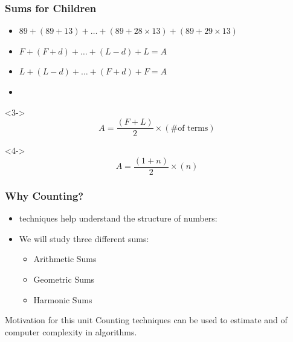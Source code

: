 \documentclass{beamer}
\begin{document}
\begin{frame}
  \frametitle{Sums for Children}

  {\larger
    
    \begin{itemize}
    \item $89 + (89+13) + \ldots + (89+28\times13) +(89+29\times13)$
    \item $F + (F+d) + \ldots + (L-d) + L = A$
    \item<2-> $L + (L-d) + \ldots + (F+d) + F = A$
    \item<3-> 
    \end{itemize}

    \bigskip

    \begin{onlyenv}<3->
      \begin{equation}
        A = \frac{(F+L)}{2} \times (\text{\# of terms})
      \end{equation}
    \end{onlyenv}

    \begin{onlyenv}<4->
      \begin{equation}
        A = \frac{(1+n)}{2} \times (n)
      \end{equation}
    \end{onlyenv}
    
  }
\end{frame}
  

\begin{frame}
  \frametitle{Why Counting?}

  {\larger

    \begin{itemize}
    \item {} techniques help understand the structure of numbers:
    \item We will study three different sums:
      \begin{itemize}
      \item Arithmetic Sums
      \item Geometric Sums
      \item Harmonic Sums
      \end{itemize}  
    \end{itemize}

    \bigskip

    \begin{block}{Motivation for this unit}
      Counting techniques can be used to estimate  and  of computer complexity in
      algorithms.
    \end{block}
  }
\end{frame}
\end{document}
